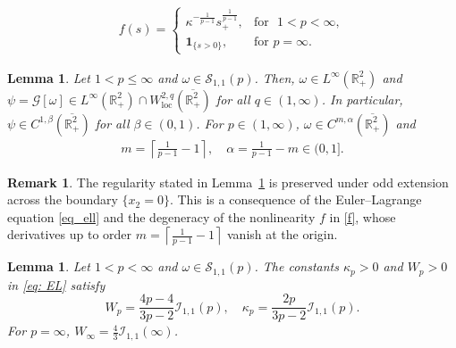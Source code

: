 \documentclass[10pt,a4paper]{amsart}
\newtheorem{lemma}[theorem]{Lemma}
\theoremstyle{definition}
\theoremstyle{definition}
\newtheorem{remark}[theorem]{Remark}
\numberwithin{equation}{section}
\newcommand{\0}{\emptyset}
\newcommand{\bbR}{\mathbb R}
\newcommand{\calG}{\mathcal G}
\newcommand{\calI}{\mathcal I}
\newcommand{\calS}{\mathcal S}
\begin{document}
\setcounter{section}{4}
\setcounter{equation}{1}
\setcounter{theorem}{0}
			\begin{equation}    
				\begin{aligned}
					f(s) = \begin{cases}
						\kappa^{-\frac{1}{p-1}} s_+^{\frac{1}{p-1}}, & \text{for }\,\, 1<p<\infty, \\[5pt]
						\mathbf{1}_{\{s > 0\}}, & \text{for}\,\, p = \infty.
					\end{cases}
				\end{aligned}
				\label{f}
			\end{equation}

\setcounter{section}{4}
\setcounter{equation}{2}
\setcounter{theorem}{0}
			\begin{lemma}\label{lem_regularity_1}
				Let $1<p \leq \infty$ and $\omega \in \calS_{1,1}(p)$. Then, $\omega\in L^{\infty}(\bbR^2_+)$ and $\psi =\calG[\omega] \in L^{\infty}(\mathbb{R}^{2}_{+})\cap W^{2,q}_{\mathrm{loc}}(\overline{\mathbb{R}_{+}^{2}})$ for all $q\in (1,\infty)$. In particular, $\psi\in C^{1,\beta}(\overline{\mathbb{R}^{2}_{+}})$ for all $\beta \in (0, 1)$. For $p\in(1,\infty)$, $\omega\in C^{m, \alpha}(\overline{\bbR^2_{+}})$ and 
				\begin{align}
					m = \left\lceil \frac{1}{p-1} - 1 \right\rceil, \quad
					\alpha = \frac{1}{p-1} - m \in (0,1]. \label{malpha}
				\end{align}
			\end{lemma}

\setcounter{section}{4}
\setcounter{equation}{3}
\setcounter{theorem}{1}
			\begin{remark}\label{rmk_reg_odd}
				The regularity stated in Lemma~\ref{lem_regularity_1} is preserved under odd extension across the boundary $\{x_2 = 0\}$.
				This is a consequence of the Euler--Lagrange equation \eqref{eq_ell} and the degeneracy of the nonlinearity $f$ in \eqref{f}, whose derivatives up to order $m = \left\lceil \frac{1}{p-1} - 1 \right\rceil$ vanish at the origin.
			\end{remark}

\setcounter{section}{4}
\setcounter{equation}{3}
\setcounter{theorem}{2}
			\begin{lemma}
				\label{lem_pohozaev}
				Let $1<p< \infty$ and $\omega \in \calS_{1, 1}(p)$.
				The constants $\kappa_p  > 0$ and $W_p> 0$ in \eqref{eq: EL} satisfy 
				\begin{equation}
					\label{eq_pohozaev}
					W_p=\frac{4p-4}{3p-2}\calI_{1,1}(p),\quad \kappa_p =\frac{2p}{3p-2} \calI_{1,1}(p).
				\end{equation}
				For $p=\infty$, $W_{\infty}=\frac{4}{3}\calI_{1,1}(\infty)$.
			\end{lemma}
\end{document}
